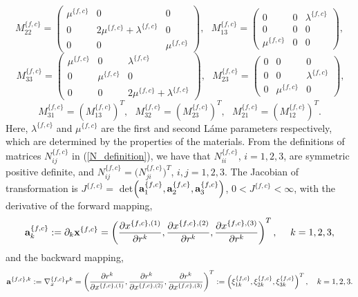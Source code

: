 \begin{equation}\label{M_definition}
M_{22}^{\{f,c\}} = \left(\begin{array}{ccc}
\mu^{\{f,c\}} & 0 & 0\\
0 & 2\mu^{\{f,c\}}+\lambda^{\{f,c\}} & 0\\
0 & 0 & \mu^{\{f,c\}}\end{array}\right),\ \ \ M_{13}^{\{f,c\}} = \left(\begin{array}{ccc}
0 & 0 & \lambda^{\{f,c\}}\\
0 & 0 & 0\\
\mu^{\{f,c\}} & 0 & 0\end{array}\right),
\end{equation}
\[\ M_{33}^{\{f,c\}} = \left(\begin{array}{ccc}
\mu^{\{f,c\}} & 0 & \lambda^{\{f,c\}}\\
0 & \mu^{\{f,c\}} & 0\\
0 & 0 & 2\mu^{\{f,c\}}+\lambda^{\{f,c\}}\end{array}\right),\ \ \ M_{23}^{\{f,c\}} = \left(\begin{array}{ccc}
0 & 0 & 0\\
0 & 0 & \lambda^{\{f,c\}}\\
0 & \mu^{\{f,c\}} & 0\end{array}\right),\]
\[ M_{31}^{\{f,c\}} = (M_{13}^{\{f,c\}})^T, \ \ \  M_{32}^{\{f,c\}} =(M_{23}^{\{f,c\}})^T, \ \ \ M_{21}^{\{f,c\}} =(M_{12}^{\{f,c\}})^T.\]
Here, $\lambda^{\{f,c\}}$ and $\mu^{\{f,c\}}$ are the first and second L{\' {a}}me parameters respectively, which are determined by the properties of the materials. From the definitions of matrices $N_{ij}^{\{f,c\}}$ in (\ref{N_definition}), we have that $N_{ii}^{\{f,c\}}$, $i = 1,2,3$, are symmetric positive definite, and $N_{ij}^{\{f,c\}}=\big(N_{ji}^{\{f,c\}}\big)^T$, $i,j=1,2,3$. The Jacobian of transformation is $J^{\{f,c\}} =$ det$\left({\bf a}^{\{f,c\}}_1,{\bf a}^{\{f,c\}}_2,{\bf a}^{\{f,c\}}_3\right)$, $0<J^{\{f,c\}}<\infty$, with the derivative of the forward mapping, 
\begin{equation}\label{forward_map}
{\bf a}_k^{\{f,c\}} := \partial_k{\bf x}^{\{f,c\}}  = \left(\frac{\partial x^{\{f,c\},(1)}}{\partial r^{k}},\frac{\partial x^{\{f,c\},(2)}}{\partial r^{k}},\frac{\partial x^{\{f,c\},(3)}}{\partial r^{k}}\right)^T,\ \ \ \ k = 1,2,3,
\end{equation}
and the backward mapping,
\begin{equation}\label{backward_map}
{\bf a}^{\{f,c\},k} := \nabla_x^{\{f,c\}} r^{k} = \left(\frac{\partial r^{k}}{\partial x^{\{f,c\},(1)}},\frac{\partial r^{k}}{\partial x^{\{f,c\},(2)}},\frac{\partial r^{k}}{\partial x^{\{f,c\},(3)}}\right)^T := \left(\xi_{1k}^{\{f,c\}},\xi_{2k}^{\{f,c\}},\xi_{3k}^{\{f,c\}}\right)^T,\ \ \ k = 1,2,3.
\end{equation}
